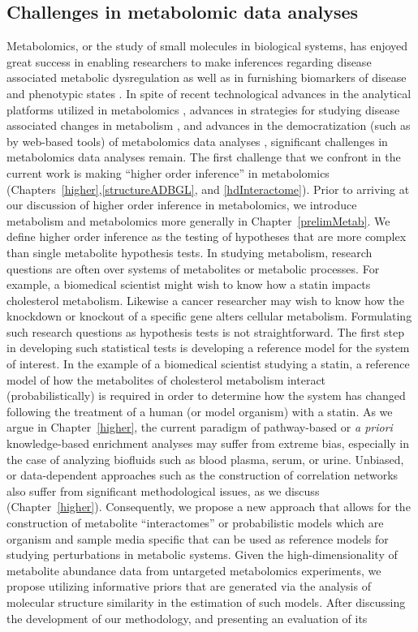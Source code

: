 \begin{DoubleSpace*}
\section{Challenges in metabolomic data analyses}
Metabolomics, or the study of small molecules in biological systems, has enjoyed great success in enabling researchers to make inferences regarding disease associated metabolic dysregulation as well as in furnishing biomarkers of disease and phenotypic states \cite{dunn2013,carlisle2016,johnson2016,newgard2017}. In spite of recent technological advances in the analytical platforms utilized in metabolomics \cite{gowda2014,gowda2016}, advances in strategies for studying disease associated changes in metabolism \cite{bruntz2017,krycer2017}, and advances in the democratization (such as by web-based tools) of metabolomics data analyses \cite{warth2017,guijas2018,chong2018}, significant challenges in metabolomics data analyses remain. The first challenge that we confront in the current work is making ``higher order inference'' in metabolomics (Chapters~\ref{higher},\ref{structureADBGL}, and \ref{hdInteractome}). Prior to arriving at our discussion of higher order inference in metabolomics, we introduce metabolism and metabolomics more generally in Chapter~\ref{prelimMetab}. We define higher order inference as the testing of hypotheses that are more complex than single metabolite hypothesis tests. In studying metabolism, research questions are often over systems of metabolites or metabolic processes. For example, a biomedical scientist might wish to know how a statin impacts cholesterol metabolism. Likewise a cancer researcher may wish to know how the knockdown or knockout of a specific gene alters cellular metabolism. Formulating such research questions as hypothesis tests is not straightforward. The first step in developing such statistical tests is developing a reference model for the system of interest. In the example of a biomedical scientist studying a statin, a reference model of how the metabolites of cholesterol metabolism interact (probabilistically) is required in order to determine how the system has changed following the treatment of a human (or model organism) with a statin. As we argue in Chapter~\ref{higher}, the current paradigm of pathway-based or \emph{a priori} knowledge-based enrichment analyses may suffer from extreme bias, especially in the case of analyzing biofluids such as blood plasma, serum, or urine. Unbiased, or data-dependent approaches such as the construction of correlation networks also suffer from significant methodological issues, as we discuss (Chapter~\ref{higher}). Consequently, we propose a new approach that allows for the construction of metabolite ``interactomes'' or probabilistic models which are organism and sample media specific that can be used as reference models for studying perturbations in metabolic systems. Given the high-dimensionality of metabolite abundance data from untargeted metabolomics experiments, we propose utilizing informative priors that are generated via the analysis of molecular structure similarity in the estimation of such models. After discussing the development of our methodology, and presenting an evaluation of its 
\end{DoubleSpace*}
